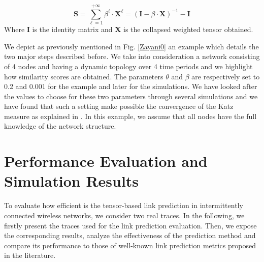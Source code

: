 \documentclass[conference]{IEEEtran}
\begin{document}
\begin{equation}
    \mathbf{S}=\sum_{\ell=1}^{+\infty} \beta^{\ell} \cdot \mathbf{X}^{\ell}=(\mathbf{I}-\beta \cdot \mathbf{X})^{-1}-\mathbf{I}
    \label{eq3}
\end{equation}
Where $\mathbf{I}$ is the identity matrix and $\mathbf{X}$ is the
collapsed weighted tensor obtained.

We depict as previously mentioned in Fig. \ref{Zayani0} an example
which details the two major steps described before. We take into
consideration a network consisting of 4 nodes and having a dynamic
topology over 4 time periods and we highlight how similarity scores
are obtained. The parameters $\theta$ and $\beta$ are respectively
set to 0.2 and 0.001 for the example and later for the simulations.
We have looked after the values to choose for these two parameters
through several simulations and we have found that such a setting
make possible the convergence of the Katz measure as explained in
\cite{Franceschet2011}. In this example, we assume that all nodes
have the full knowledge of the network structure.

\section{Performance Evaluation and Simulation Results}
To evaluate how efficient is the tensor-based link prediction in
intermittently connected wireless networks, we consider two real
traces. In the following, we firstly present the traces used for the
link prediction evaluation. Then, we expose the corresponding
results, analyze the effectiveness of the prediction method and
compare its performance to those of well-known link prediction
metrics proposed in the literature.
\end{document}
